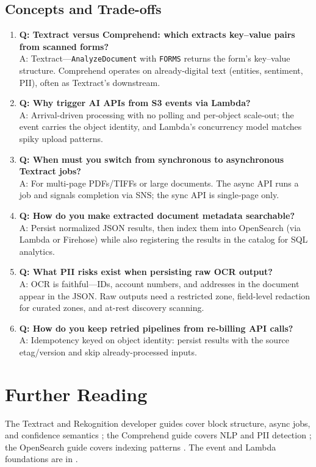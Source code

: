 \subsection{Concepts and Trade-offs}
\begin{enumerate}
    \item \textbf{Q: Textract versus Comprehend: which extracts key--value pairs from scanned forms?}\\
    A: Textract---\texttt{AnalyzeDocument} with \texttt{FORMS} returns the form's key--value structure. Comprehend operates on already-digital text (entities, sentiment, PII), often as Textract's downstream.
    \item \textbf{Q: Why trigger AI APIs from S3 events via Lambda?}\\
    A: Arrival-driven processing with no polling and per-object scale-out; the event carries the object identity, and Lambda's concurrency model matches spiky upload patterns.
    \item \textbf{Q: When must you switch from synchronous to asynchronous Textract jobs?}\\
    A: For multi-page PDFs/TIFFs or large documents. The async API runs a job and signals completion via SNS; the sync API is single-page only.
    \item \textbf{Q: How do you make extracted document metadata searchable?}\\
    A: Persist normalized JSON results, then index them into OpenSearch (via Lambda or Firehose) while also registering the results in the catalog for SQL analytics.
    \item \textbf{Q: What PII risks exist when persisting raw OCR output?}\\
    A: OCR is faithful---IDs, account numbers, and addresses in the document appear in the JSON. Raw outputs need a restricted zone, field-level redaction for curated zones, and at-rest discovery scanning.
    \item \textbf{Q: How do you keep retried pipelines from re-billing API calls?}\\
    A: Idempotency keyed on object identity: persist results with the source etag/version and skip already-processed inputs.
\end{enumerate}

\section{Further Reading}
The Textract and Rekognition developer guides cover block structure, async jobs, and confidence semantics \cite{awsTextractDocs,awsRekognitionDocs}; the Comprehend guide covers NLP and PII detection \cite{awsComprehendDocs}; the OpenSearch guide covers indexing patterns \cite{awsOpenSearchDocs}. The event and Lambda foundations are in \cite{awsEventBridgeDocs,awsLambdaDocs}.

